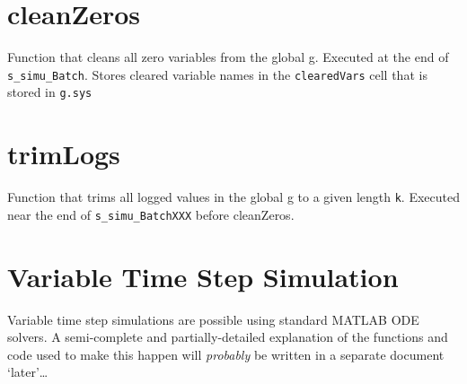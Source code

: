 \section{cleanZeros}  
Function that cleans all zero variables from the global g.
Executed at the end of \verb|s_simu_Batch|.
Stores cleared variable names in the \verb|clearedVars| cell that is stored in \verb|g.sys|

\section{trimLogs}  
Function that trims all logged values in the global g to a given length \verb|k|.
Executed near the end of \verb|s_simu_BatchXXX| before cleanZeros.

\section{Variable Time Step Simulation}  
Variable time step simulations are possible using standard MATLAB ODE solvers.
A semi-complete and partially-detailed explanation of the functions and code used to make this happen will \emph{probably} be written in a separate document `later'\ldots



